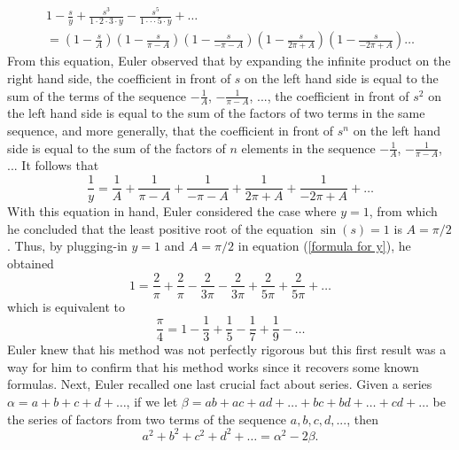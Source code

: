 \begin{multline}
    1 - \frac{s}{y} + \frac{s^3}{1\cdot 2 \cdot 3\cdot y} - \frac{s^5}{1\cdot \cdot \cdot 5 \cdot y} + \dots \\
    = \left(1 - \frac{s}{A}\right)\left(1 - \frac{s}{\pi - A}\right)\left(1 - \frac{s}{-\pi - A}\right)\left(1 - \frac{s}{2\pi + A}\right)\left(1 - \frac{s}{-2\pi + A}\right) \dots
\end{multline}
From this equation, Euler observed that by expanding the infinite product on the right hand side, the coefficient in front of $s$ on the left hand side is equal to the sum of the terms of the sequence $-\frac{1}{A}$, $-\frac{1}{\pi - A}$, ..., the coefficient in front of $s^2$ on the left hand side is equal to the sum of the factors of two terms in the same sequence, and more generally, that the coefficient in front of $s^n$ on the left hand side is equal to the sum of the factors of $n$ elements in the sequence $-\frac{1}{A}$, $-\frac{1}{\pi - A}$, ... It follows that
\begin{equation} \label{formula for y}
    \frac{1}{y} = \frac{1}{A} + \frac{1}{\pi - A} + \frac{1}{-\pi - A} + \frac{1}{2\pi + A} + \frac{1}{-2\pi + A} + \dots
\end{equation}
With this equation in hand, Euler considered the case where $y = 1$, from which he concluded that the least positive root of the equation $\sin(s) = 1$ is $A = \pi / 2$. Thus, by plugging-in $y=1$ and $A = \pi / 2$ in equation (\ref{formula for y}), he obtained
\begin{equation} \label{pre Leibniz Series}
    1 = \frac{2}{\pi} + \frac{2}{\pi} - \frac{2}{3\pi} - \frac{2}{3\pi} + \frac{2}{5\pi} + \frac{2}{5\pi} + \dots
\end{equation}
which is equivalent to
\begin{equation} \label{Leibniz Series}
    \frac{\pi}{4} = 1 - \frac{1}{3} + \frac{1}{5} - \frac{1}{7} + \frac{1}{9} - \dots
\end{equation}
Euler knew that his method was not perfectly rigorous but this first result was a way for him to confirm that his method works since it recovers some known formulas. Next, Euler recalled one last crucial fact about series. Given a series $\alpha = a + b + c + d + \dots$, if we let $\beta = ab + ac + ad + \dots + bc + bd + \dots + cd + \dots$ be the series of factors from two terms of the sequence $a,b,c,d, ...$, then 
\begin{equation} \label{series of squares and square of series}
    a^2 + b^2 + c^2 + d^2 + \dots = \alpha^2 - 2\beta.
\end{equation}
